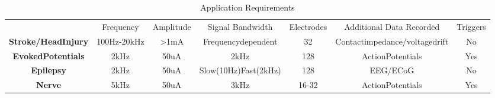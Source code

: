 \begin{table} 
    \begin{tabular}{ c c c c c c c }
         & Frequency & Amplitude & Signal Bandwidth & Electrodes & Additional Data Recorded & Triggers \\ 
        \textbf{Stroke/HeadInjury} & 100Hz-20kHz & >1mA & Frequencydependent & 32 & Contactimpedance/voltagedrift & No \\ 
        \textbf{EvokedPotentials} & 2kHz & 50uA & 2kHz & 128 & ActionPotentials & Yes \\ 
        \textbf{Epilepsy} & 2kHz & 50uA & Slow(10Hz)Fast(2kHz) & 128 & EEG/ECoG & No \\ 
        \textbf{Nerve} & 5kHz & 50uA & 3kHz & 16-32 & ActionPotentials & Yes \\ 
    \end{tabular} 
    \caption{Application Requirements} 
\end{table}